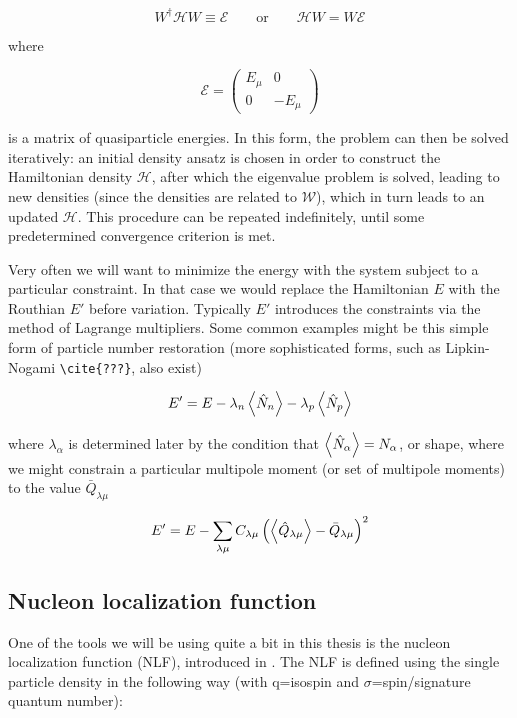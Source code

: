 \begin{equation}
W^\dagger \mathcal{H} W \equiv \mathcal{E} \qquad\mathrm{or}\qquad \mathcal{H}W = W\mathcal{E}
\end{equation}

\noindent where

\begin{equation}
\mathcal{E} = \left(\begin{array}{cc}
E_\mu & 0 \\
0 & -E_\mu
\end{array}\right)
\end{equation}

\noindent is a matrix of quasiparticle energies. In this form, the problem can then be solved iteratively: an initial density ansatz is chosen in order to construct the Hamiltonian density $\mathcal{H}$, after which the eigenvalue problem is solved, leading to new densities (since the densities are related to $\mathcal{W}$), which in turn leads to an updated $\mathcal{H}$. This procedure can be repeated indefinitely, until some predetermined convergence criterion is met.

Very often we will want to minimize the energy with the system subject to a particular constraint. In that case we would replace the Hamiltonian $E$ with the Routhian $E'$ before variation. Typically $E'$ introduces the constraints via the method of Lagrange multipliers. Some common examples might be this simple form of particle number restoration (more sophisticated forms, such as Lipkin-Nogami \verb|\cite{???}|, also exist)

\begin{equation}
E' = E - \lambda_n \expval{\hat{N}_n} - \lambda_p \expval{\hat{N}_p}
\end{equation}

\noindent where $\lambda_\alpha$ is determined later by the condition that $\expval{\hat{N}_\alpha} = N_\alpha$, or shape, where we might constrain a particular multipole moment (or set of multipole moments) to the value $\bar{Q}_{\lambda\mu}$

\begin{equation}
E' = E - \sum_{\lambda\mu} C_{\lambda\mu} \left(\expval{\hat{Q}_{\lambda\mu}} - \bar{Q}_{\lambda\mu}\right)^2
\end{equation}


\subsection{Nucleon localization function}\label{sect:locali}
One of the tools we will be using quite a bit in this thesis is the nucleon localization function (NLF), introduced in \cite{Zhang2016}. The NLF is defined using the single particle density in the following way (with q=isospin and $\sigma$=spin/signature quantum number):


